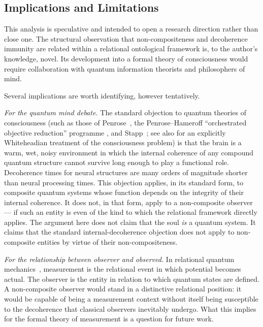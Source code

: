 \subsection{Implications and Limitations}

This analysis is speculative and intended to open a research direction
rather than close one.
The structural observation that non-compositeness and decoherence immunity
are related within a relational ontological framework is, to the author's
knowledge, novel.
Its development into a formal theory of consciousness would require
collaboration with quantum information theorists and philosophers of mind.

Several implications are worth identifying, however tentatively.

\emph{For the quantum mind debate.}
The standard objection to quantum theories of consciousness (such as those
of Penrose~\citeyearpar{Penrose1989}, the Penrose--Hameroff
``orchestrated objective reduction'' programme \citep{HameroffPenrose2014},
and Stapp~\citeyearpar{Stapp2007}; see also \citealt{Griffin2000} for an
explicitly Whiteheadian treatment of the consciousness problem)
is that the brain is a warm, wet, noisy environment in which the
internal coherence of any compound quantum structure cannot survive
long enough to play a functional role.
Decoherence times for neural structures are many orders of magnitude
shorter than neural processing times.
This objection applies, in its standard form, to composite quantum
systems whose function depends on the integrity of their internal
coherence.
It does not, in that form, apply to a non-composite observer ---
if such an entity is even of the kind to which the relational
framework directly applies.
The argument here does not claim that the soul \emph{is} a quantum system.
It claims that the standard internal-decoherence objection does not
apply to non-composite entities by virtue of their non-compositeness.

\emph{For the relationship between observer and observed.}
In relational quantum mechanics~\citep{Rovelli1996}, measurement is the
relational event in which potential becomes actual.
The observer is the entity in relation to which quantum states are defined.
A non-composite observer would stand in a distinctive relational position:
it would be capable of being a measurement context without itself being
susceptible to the decoherence that classical observers inevitably undergo.
What this implies for the formal theory of measurement is a question for
future work.

